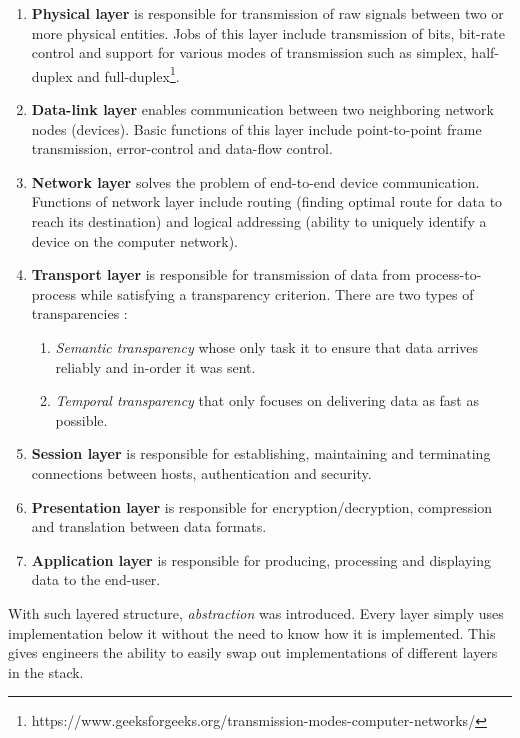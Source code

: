 \documentclass[times, utf8, diplomski]{fer}
\begin{document}
\begin{enumerate}
	\item \textbf{Physical layer} is responsible for transmission of raw signals between two or more physical entities. Jobs of this layer include transmission of bits, bit-rate control and support for various modes of transmission such as simplex, half-duplex and full-duplex\footnote{https://www.geeksforgeeks.org/transmission-modes-computer-networks/}.
	
	\item \textbf{Data-link layer} enables communication between two neighboring network nodes (devices). Basic functions of this layer include point-to-point frame transmission, error-control and data-flow control. 
	
	\item \textbf{Network layer} solves the problem of end-to-end device communication. Functions of network layer include routing (finding optimal route for data to reach its destination) and logical addressing (ability to uniquely identify a device on the computer network).
	
	\item \textbf{Transport layer} is responsible for transmission of data from process-to-process while satisfying a transparency criterion. There are two types of transparencies \cite{kommre}:
	
	\begin{enumerate}
		\item \textit{Semantic transparency} whose only task it to ensure that data arrives reliably and in-order it was sent.
		\item \textit{Temporal transparency} that only focuses on delivering data as fast as possible.
	\end{enumerate}

	\item \textbf{Session layer} is responsible for establishing, maintaining and terminating connections between hosts, authentication and security.
	
	\item \textbf{Presentation layer} is responsible for encryption/decryption, compression and translation between data formats.
	
	\item \textbf{Application layer} is responsible for producing, processing and displaying data to the end-user.
\end{enumerate}

With such layered structure, \textit{abstraction} was introduced. Every layer simply uses implementation below it without the need to know how it is implemented. This gives engineers the ability to easily swap out implementations of different layers in the stack.
\end{document}
